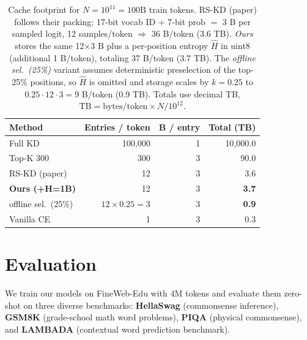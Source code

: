 \documentclass[11pt]{article}
\begin{document}
\begin{table}[h]
	\centering
	\begin{adjustbox}{max width=\linewidth}
		\begin{tabular}{lrrr}
			\toprule
			Method                    & Entries / token          & B / entry & Total (TB)   \\
			\midrule
			Full KD                   & 100{,}000                & 1         & 10{,}000.0   \\
			Top-K 300                 & 300                      & 3         & 90.0         \\
			RS-KD (paper)             & 12                       & 3         & 3.6          \\
			\textbf{Ours (+H=1B)}     & 12                       & 3         & \textbf{3.7} \\
			\quad offline sel.~(25\%) & $12 \!\times\! 0.25 = 3$ & 3         & \textbf{0.9} \\
			Vanilla CE                & 1                        & 3         & 0.3          \\
			\bottomrule
		\end{tabular}
	\end{adjustbox}
	\caption{Cache footprint for $N{=}10^{11}{=}100\text{B}$ train tokens. RS-KD (paper) follows their packing: 17-bit vocab ID + 7-bit prob $=$ 3 B per sampled logit, 12 samples/token $\Rightarrow$ 36 B/token (3.6 TB). \textit{Ours} stores the same 12$\times$3 B plus a per-position entropy $\hat H$ in uint8 (additional 1 B/token), totaling 37 B/token (3.7 TB). The \textit{offline sel.~(25\%)} variant assumes deterministic preselection of the top-25\% positions, so $\hat H$ is omitted and storage scales by $k{=}0.25$ to $0.25{\cdot}12{\cdot}3{=}9$ B/token (0.9 TB). Totals use decimal TB, $\mathrm{TB}=\text{bytes/token}\times N/10^{12}$.}
	\label{tab:storage}
\end{table}

\section{Evaluation}
\label{sec:evaluation}

We train our models on FineWeb-Edu with 4M tokens and evaluate them zero-shot on three diverse benchmarks: \textbf{HellaSwag} \citep{zellers2019hellaswag} (commonsense inference), \textbf{GSM8K} \citep{cobbe2021gsm8k} (grade-school math word problems), \textbf{PIQA} \citep{bisk2019piqa} (physical commonsense), and \textbf{LAMBADA} \citep{paperno2016lambada} (contextual word prediction benchmark).
\end{document}
